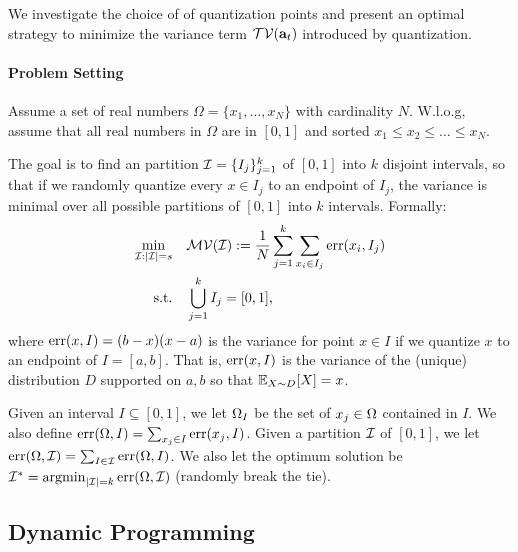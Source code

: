 We investigate the choice of of quantization points and present an optimal strategy to minimize the variance term $\mathcal{TV}({\bf a}_t)$ introduced by quantization.
\paragraph*{Problem Setting}
Assume a set of real numbers $\Omega = \{x_1, \ldots, x_N\}$ with cardinality $N$. W.l.o.g, assume that all real numbers in $\Omega$ are in $[0, 1]$ and sorted $x_1 \leq x_2 \leq \ldots \leq x_N$. 

The goal is to find an partition $\mathcal{I} = \{I_j\}_{j = 1}^k$ of $[0, 1]$ into $k$ disjoint intervals, so that if we randomly quantize every $x \in I_j$ to an endpoint of $I_j$, the variance is minimal over all possible partitions of $[0, 1]$ into $k$ intervals.
Formally:
\begin{align}
\nonumber \min_{\mathcal{I}: |\mathcal{I}| = s} \quad & \mathcal{MV}(\mathcal{I}) := {1\over N}\sum_{j = 1}^k \sum_{x_i \in I_j} \mathrm{err}(x_i, I_j)\\
\text{s.t.}\quad & \bigcup_{j = 1}^k I_j = [0, 1],
\label{eq:opt_Q}
\end{align}
where $\mathrm{err} (x, I) = (b - x) (x - a)$ is the variance for point $x \in I$ if we quantize $x$ to an endpoint of $I = [a, b]$.
That is, $\mathrm{err} (x, I)$ is the variance of the (unique) distribution $D$ supported on ${a, b}$  so that $\mathbb{E}_{X \sim D} [X] = x$.


Given an interval $I \subseteq [0, 1]$, we let $\Omega_I$ be the set of $x_j \in \Omega$ contained in $I$.
We also define $\mathrm{err} (\Omega, I) = \sum_{x_j \in I} \mathrm{err} (x_j, I)$.
Given a partition $\mathcal{I}$ of $[0, 1]$, we let $\mathrm{err} (\Omega, \mathcal{I}) = \sum_{I \in \mathcal{I}} \mathrm{err} (\Omega, I)$.
We also let the optimum solution be $\mathcal{I}^* = \operatorname*{argmin}_{|\mathcal{I}| = k} \mathrm{err} (\Omega, \mathcal{I})$ (randomly break the tie). %


\vspace{-0.5em}
\subsection{Dynamic Programming}
\vspace{-0.5em}

